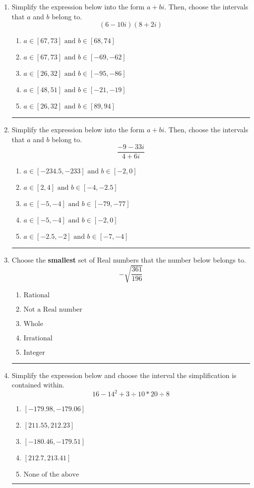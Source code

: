 \documentclass[14pt]{extbook}
\newcommand{\litem}[1]{\item#1\hspace*{-1cm}\rule{\textwidth}{0.4pt}}
\begin{document}
\begin{enumerate}
{\begin{enumerate}[label=\Alph*.]
\end{enumerate} }
\litem{
Simplify the expression below into the form $a+bi$. Then, choose the intervals that $a$ and $b$ belong to.\[ (6 - 10 i)(8 + 2 i) \]\begin{enumerate}[label=\Alph*.]
\item \( a \in [67, 73] \text{ and } b \in [68, 74] \)
\item \( a \in [67, 73] \text{ and } b \in [-69, -62] \)
\item \( a \in [26, 32] \text{ and } b \in [-95, -86] \)
\item \( a \in [48, 51] \text{ and } b \in [-21, -19] \)
\item \( a \in [26, 32] \text{ and } b \in [89, 94] \)

\end{enumerate} }
\litem{
Simplify the expression below into the form $a+bi$. Then, choose the intervals that $a$ and $b$ belong to.\[ \frac{-9 - 33 i}{4 + 6 i} \]\begin{enumerate}[label=\Alph*.]
\item \( a \in [-234.5, -233] \text{ and } b \in [-2, 0] \)
\item \( a \in [2, 4] \text{ and } b \in [-4, -2.5] \)
\item \( a \in [-5, -4] \text{ and } b \in [-79, -77] \)
\item \( a \in [-5, -4] \text{ and } b \in [-2, 0] \)
\item \( a \in [-2.5, -2] \text{ and } b \in [-7, -4] \)

\end{enumerate} }
\litem{
Choose the \textbf{smallest} set of Real numbers that the number below belongs to.\[ -\sqrt{\frac{361}{196}} \]\begin{enumerate}[label=\Alph*.]
\item \( \text{Rational} \)
\item \( \text{Not a Real number} \)
\item \( \text{Whole} \)
\item \( \text{Irrational} \)
\item \( \text{Integer} \)

\end{enumerate} }
\litem{
Simplify the expression below and choose the interval the simplification is contained within.\[ 16 - 14^2 + 3 \div 10 * 20 \div 8 \]\begin{enumerate}[label=\Alph*.]
\item \( [-179.98, -179.06] \)
\item \( [211.55, 212.23] \)
\item \( [-180.46, -179.51] \)
\item \( [212.7, 213.41] \)
\item \( \text{None of the above} \)


\end{enumerate}}
\end{enumerate}
\end{document}
